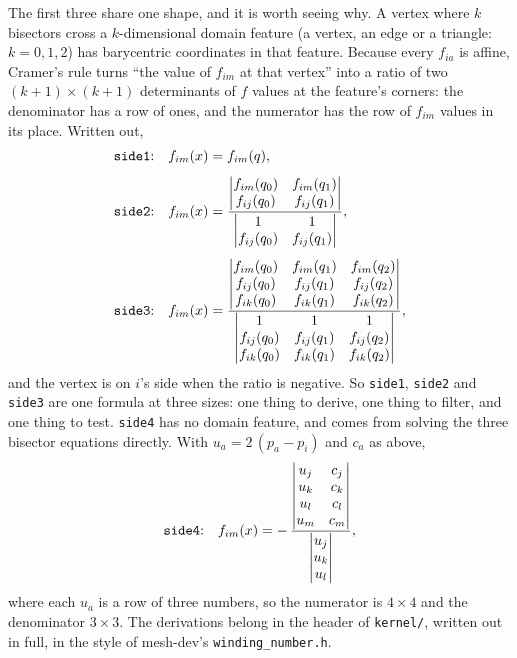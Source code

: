 \documentclass[11pt,a4paper]{article}
\newcommand{\code}[1]{\texttt{#1}}          %
\begin{document}
The first three share one shape, and it is worth seeing why. A vertex where $k$ bisectors cross
a $k$-dimensional domain feature (a vertex, an edge or a triangle: $k = 0, 1, 2$) has
barycentric coordinates in that feature. Because every $f_{ia}$ is affine, Cramer's rule turns
``the value of $f_{im}$ at that vertex'' into a ratio of two $(k+1)\times(k+1)$ determinants of
$f$ values at the feature's corners: the denominator has a row of ones, and the numerator has
the row of $f_{im}$ values in its place. Written out,
\begin{align*}
  \text{\code{side1}:}\quad f_{im}(x) &= f_{im}(q),\\[4pt]
  \text{\code{side2}:}\quad f_{im}(x) &=
    \frac{\begin{vmatrix} f_{im}(q_0) & f_{im}(q_1) \\ f_{ij}(q_0) & f_{ij}(q_1) \end{vmatrix}}
         {\begin{vmatrix} 1 & 1 \\ f_{ij}(q_0) & f_{ij}(q_1) \end{vmatrix}},\\[4pt]
  \text{\code{side3}:}\quad f_{im}(x) &=
    \frac{\begin{vmatrix} f_{im}(q_0) & f_{im}(q_1) & f_{im}(q_2) \\
                          f_{ij}(q_0) & f_{ij}(q_1) & f_{ij}(q_2) \\
                          f_{ik}(q_0) & f_{ik}(q_1) & f_{ik}(q_2) \end{vmatrix}}
         {\begin{vmatrix} 1 & 1 & 1 \\
                          f_{ij}(q_0) & f_{ij}(q_1) & f_{ij}(q_2) \\
                          f_{ik}(q_0) & f_{ik}(q_1) & f_{ik}(q_2) \end{vmatrix}},
\end{align*}
and the vertex is on $i$'s side when the ratio is negative. So \code{side1}, \code{side2} and
\code{side3} are one formula at three sizes: one thing to derive, one thing to filter, and one
thing to test. \code{side4} has no domain feature, and comes from solving the three bisector
equations directly. With $u_a = 2\,(p_a - p_i)$ and $c_a$ as above,
\[
  \text{\code{side4}:}\quad f_{im}(x) = -\,
    \frac{\begin{vmatrix} u_j & c_j \\ u_k & c_k \\ u_l & c_l \\ u_m & c_m \end{vmatrix}}
         {\begin{vmatrix} u_j \\ u_k \\ u_l \end{vmatrix}},
\]
where each $u_a$ is a row of three numbers, so the numerator is $4\times 4$ and the denominator
$3\times 3$. The derivations belong in the header of \code{kernel/}, written out in full, in the
style of mesh-dev's \code{winding\_number.h}.
\end{document}
